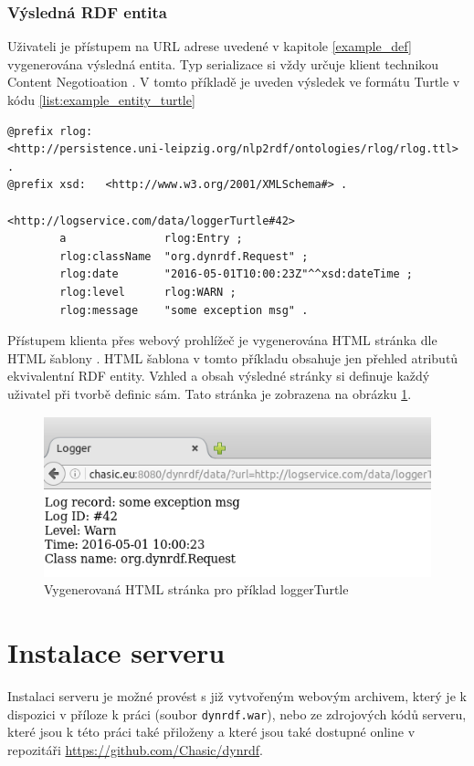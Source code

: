 \documentclass[thesis=B,czech]{FITthesis}[2012/06/26]
\begin{document}
    
    \subsubsection{Výsledná RDF entita}
    Uživateli je přístupem na URL adrese uvedené v kapitole \ref{example_def} vygenerována výsledná entita. Typ serializace si vždy určuje klient technikou
    Content Negotioation \cite{content_negotiation}. V tomto příkladě je uveden výsledek ve formátu Turtle v kódu \ref{list:example_entity_turtle}
                   \begin{lstlisting}[float=htb,caption={Výsledná entita ve formátu Turtle pro příklad objektu loggerTurtle},label={list:example_entity_turtle}]
@prefix rlog:  
<http://persistence.uni-leipzig.org/nlp2rdf/ontologies/rlog/rlog.ttl> .
@prefix xsd:   <http://www.w3.org/2001/XMLSchema#> .

<http://logservice.com/data/loggerTurtle#42>
        a               rlog:Entry ;
        rlog:className  "org.dynrdf.Request" ;
        rlog:date       "2016-05-01T10:00:23Z"^^xsd:dateTime ;
        rlog:level      rlog:WARN ;
        rlog:message    "some exception msg" .
\end{lstlisting}

Přístupem klienta přes webový prohlížeč je vygenerována HTML stránka dle HTML šablony \label{list:html}. HTML šablona v tomto příkladu
obsahuje jen přehled atributů ekvivalentní RDF entity. Vzhled a obsah výsledné stránky si definuje každý uživatel při tvorbě definic sám.
Tato stránka je zobrazena na obrázku \ref{example_html_output}.
    \begin{figure}\centering
 	\includegraphics[width=\textwidth]{example_html_output}
 	\caption[Vygenerovaná HTML stránka pro příklad loggerTurtle]{Vygenerovaná HTML stránka pro příklad loggerTurtle}\label{example_html_output}		
  \end{figure}


    
  \section{Instalace serveru}
  Instalaci serveru je možné provést s již vytvořeným webovým archivem, který je k dispozici v příloze k práci (soubor \texttt{dynrdf.war}), nebo ze zdrojových kódů serveru,
  které jsou k této práci také přiloženy a které jsou také dostupné online v repozitáři \url{https://github.com/Chasic/dynrdf}.
  
\end{document}
